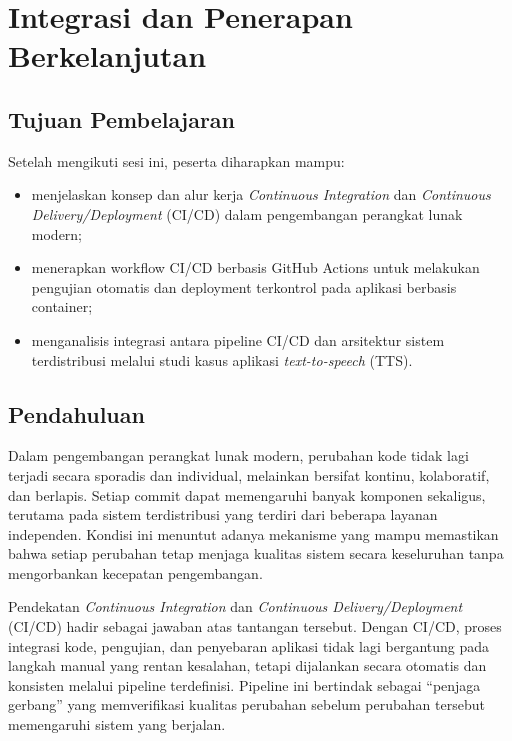 \chapter{Integrasi dan Penerapan Berkelanjutan}


\section{Tujuan Pembelajaran}

Setelah mengikuti sesi ini, peserta diharapkan mampu:
\begin{itemize}
  \item menjelaskan konsep dan alur kerja \textit{Continuous Integration} dan \textit{Continuous Delivery/Deployment} (CI/CD) dalam pengembangan perangkat lunak modern;
  \item menerapkan workflow CI/CD berbasis GitHub Actions untuk melakukan pengujian otomatis dan deployment terkontrol pada aplikasi berbasis container;
  \item menganalisis integrasi antara pipeline CI/CD dan arsitektur sistem terdistribusi melalui studi kasus aplikasi \textit{text-to-speech} (TTS).
\end{itemize}


\section{Pendahuluan}

Dalam pengembangan perangkat lunak modern, perubahan kode tidak lagi terjadi secara sporadis dan individual, melainkan bersifat kontinu, kolaboratif, dan berlapis. Setiap commit dapat memengaruhi banyak komponen sekaligus, terutama pada sistem terdistribusi yang terdiri dari beberapa layanan independen. Kondisi ini menuntut adanya mekanisme yang mampu memastikan bahwa setiap perubahan tetap menjaga kualitas sistem secara keseluruhan tanpa mengorbankan kecepatan pengembangan.

Pendekatan \textit{Continuous Integration} dan \textit{Continuous Delivery/Deployment} (CI/CD) hadir sebagai jawaban atas tantangan tersebut. Dengan CI/CD, proses integrasi kode, pengujian, dan penyebaran aplikasi tidak lagi bergantung pada langkah manual yang rentan kesalahan, tetapi dijalankan secara otomatis dan konsisten melalui pipeline terdefinisi. Pipeline ini bertindak sebagai ``penjaga gerbang'' yang memverifikasi kualitas perubahan sebelum perubahan tersebut memengaruhi sistem yang berjalan.

